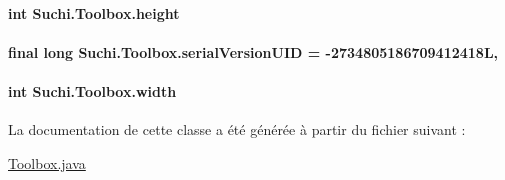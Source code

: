 \paragraph[{height}]{\setlength{\rightskip}{0pt plus 5cm}int Suchi.\+Toolbox.\+height\hspace{0.3cm}{\ttfamily [package]}}\label{classSuchi_1_1Toolbox_a753bd209284a7e4e572654ee5c247ca8}
\hypertarget{classSuchi_1_1Toolbox_aa2f48461c4cdf625a242776471ec8f63}{}
\paragraph[{serial\+Version\+U\+I\+D}]{\setlength{\rightskip}{0pt plus 5cm}final long Suchi.\+Toolbox.\+serial\+Version\+U\+I\+D = -\/2734805186709412418\+L\hspace{0.3cm}{\ttfamily [static]}, {\ttfamily [private]}}\label{classSuchi_1_1Toolbox_aa2f48461c4cdf625a242776471ec8f63}
\hypertarget{classSuchi_1_1Toolbox_ae6ccf38ddbd7c1fdcd31573ed4d3046e}{}
\paragraph[{width}]{\setlength{\rightskip}{0pt plus 5cm}int Suchi.\+Toolbox.\+width\hspace{0.3cm}{\ttfamily [private]}}\label{classSuchi_1_1Toolbox_ae6ccf38ddbd7c1fdcd31573ed4d3046e}


La documentation de cette classe a été générée à partir du fichier suivant \+:\begin{DoxyCompactItemize}
\item 
\hyperlink{Toolbox_8java}{Toolbox.\+java}\end{DoxyCompactItemize}

